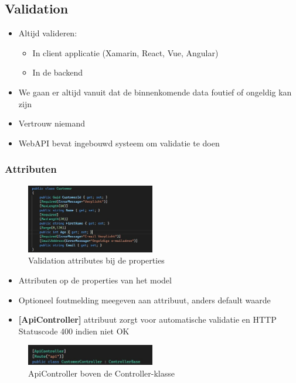 \documentclass{article}
\begin{document}
\subsection{Validation}

\begin{itemize}
    \item Altijd valideren:
    \begin{itemize}
        \item In client applicatie (Xamarin, React, Vue, Angular)
        \item In de backend
    \end{itemize}
    \item We gaan er altijd vanuit dat de binnenkomende data foutief of ongeldig kan zijn
    \item Vertrouw niemand
    \item WebAPI bevat ingebouwd systeem om validatie te doen
\end{itemize}

\subsubsection{Attributen}

\begin{figure}[H]
    \centering
    \includegraphics[width=0.5\textwidth]{validation-attributes.png}
    \caption{Validation attributes bij de properties}
\end{figure}


\begin{itemize}
    \item Attributen op de properties van het model
    \item Optioneel foutmelding meegeven aan attribuut, anders default waarde
    \item \textbf{[ApiController]} attribuut zorgt voor automatische validatie en HTTP Statuscode 400 indien niet OK
\end{itemize}

\begin{figure}[H]
    \centering
    \includegraphics[width=0.5\textwidth]{validation-attributes2.png}
    \caption{ApiController boven de Controller-klasse}
\end{figure}
\end{document}
